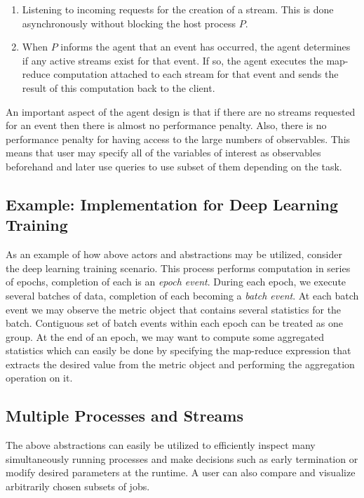 \documentclass[sigchi]{acmart} %
\begin{document}
\begin{enumerate}
  \item Listening to incoming requests for the creation of a stream. This is done asynchronously without blocking the host process $P$.
  \item When $P$ informs the agent that an event has occurred, the agent determines if any active streams exist for that event. If so, the agent executes the map-reduce computation attached to each stream for that event and sends the result of this computation back to the client.
\end{enumerate}

An important aspect of the agent design is that if there are no streams requested for an event then there is almost no performance penalty. Also, there is no performance penalty for having access to the large numbers of observables. This means that user may specify all of the variables of interest as observables beforehand and later use queries to use subset of them depending on the task.

\subsection{Example: Implementation for Deep Learning Training}

As an example of how above actors and abstractions may be utilized, consider the deep learning training scenario. This process performs computation in series of epochs, completion of each is an \emph{epoch event}. During each epoch, we execute several batches of data, completion of each becoming a \emph{batch event}. At each batch event we may observe the metric object that contains several statistics for the batch. Contiguous set of batch events within each epoch can be treated as one group. At the end of an epoch, we may want to compute some aggregated statistics which can easily be done by specifying the map-reduce expression that extracts the desired value from the metric object and performing the aggregation operation on it.

\subsection{Multiple Processes and Streams}
The above abstractions can easily be utilized to efficiently inspect many simultaneously running processes and make decisions such as early termination or modify desired parameters at the runtime. A user can also compare and visualize arbitrarily chosen subsets of jobs. 
\end{document}
